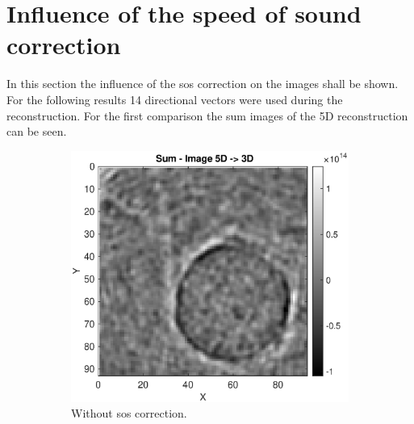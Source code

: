 \newpage
      
\section{Influence of the speed of sound correction }
In this section the influence of the \ac{sos} correction on the images shall be shown. For the following results 14 directional vectors were used during the reconstruction. For the first comparison the sum images of the 5D reconstruction can be seen.


\begin{figure}[H]
     \centering
     \begin{subfigure}[b]{0.47\textwidth}
                  \centering
         \includegraphics[width=1.09\textwidth]{Graphics/Results/14_vecs_sos_vs_noSos/sum_14vecs_no_sos_z_direction.eps}
         \caption{Without \ac{sos} correction.}
         \label{sos:influence_sum_images_without}
     \end{subfigure}
     \hfill
     \begin{subfigure}[b]{0.47\textwidth}
         \centering

\end{subfigure}
\end{figure}
